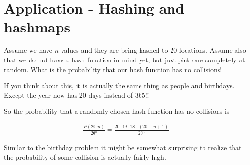\documentclass[12pt]{article}
\begin{document}
\section*{Application - Hashing and hashmaps}

Assume we have $n$ values and they are being hashed to 20 locations. Assume also that we do not have a hash function in mind yet, but just pick one completely at random. What is the probability that our hash function has no collisions!

If you think about this, it is actually the same thing as people and birthdays. Except the year now has 20 days instead of 365!!

So the probability that a randomly chosen hash function has no collisions is

\begin{align*}
\frac{P(20, n)}{20^n} = \frac{20 \cdot 19 \cdot 18 \cdots (20 - n + 1)} {20^n}
\end{align*}

Similar to the birthday problem it might be somewhat surprising to realize that the probability of some collision is actually fairly high.
\end{document}
